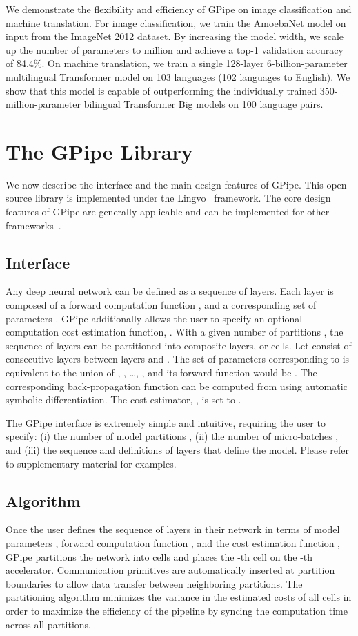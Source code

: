 \documentclass{article}
\def\codename{GPipe}
\begin{document}
We demonstrate the flexibility and efficiency of \codename{} on image classification and machine translation. For image classification, we train the AmoebaNet model on  input from the ImageNet 2012 dataset. By increasing the model width, we scale up the number of parameters to  million and achieve a top-1 validation accuracy of 84.4\%. On machine translation, we train a single 128-layer 6-billion-parameter multilingual Transformer model on 103 languages (102 languages to English). We show that this model is capable of outperforming the individually trained 350-million-parameter bilingual Transformer Big \cite{vaswani2017attention} models on 100 language pairs.

\section{The \codename{} Library}
We now describe the interface and the main design features of \codename{}. This open-source library is implemented  under the Lingvo~\cite{shen2019lingvo} framework. The core design features of \codename{} are generally applicable and can be implemented for other frameworks~\cite{jia2014caffe, chen2015mxnet,paszke2017automatic}.

\subsection{Interface}
Any deep neural network can be defined as a sequence of  layers. Each layer  is composed of a forward computation function , and a corresponding set of parameters . \codename{} additionally allows the user to specify an optional computation cost estimation function, . With a given number of partitions , the sequence of  layers can be partitioned into  composite layers, or cells. Let   consist of consecutive layers between layers  and . The set of parameters corresponding to  is equivalent to the union of , , \ldots, , and its forward function would be . The corresponding back-propagation function  can be computed from  using automatic symbolic differentiation. The cost estimator, , is set to .

The \codename{} interface is extremely simple and intuitive, requiring the user to specify: (i) the number of model partitions ,  (ii) the number of micro-batches , and (iii) the sequence and definitions of  layers that define the model. Please refer to supplementary material for examples.

\subsection{Algorithm}
Once the user defines the sequence of layers in their network in terms of model parameters , forward computation function , and the cost estimation function , \codename{}  partitions the network into  cells and places the -th cell on the -th accelerator. Communication primitives are automatically inserted at partition boundaries to allow data transfer between neighboring partitions. The partitioning algorithm minimizes the variance in the estimated costs of all cells in order to maximize the efficiency of the pipeline by syncing the computation time across all partitions.
\end{document}

